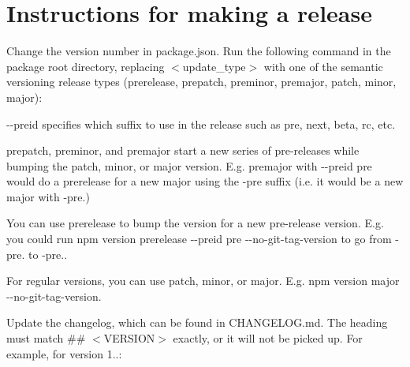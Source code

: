 \chapter{Instructions for making a release}
\hypertarget{md_node__modules_2_0dmapbox_2node-pre-gyp_2_r_e_l_e_a_s_e}{}\label{md_node__modules_2_0dmapbox_2node-pre-gyp_2_r_e_l_e_a_s_e}
\label{md_node__modules_2_0dmapbox_2node-pre-gyp_2_r_e_l_e_a_s_e_autotoc_md4880}%
%



\begin{DoxyEnumerate}
\item Change the version number in {\ttfamily package.\+json}. Run the following command in the package root directory, replacing $<$update\+\_\+type$>$ with one of the semantic versioning release types (prerelease, prepatch, preminor, premajor, patch, minor, major)\+:
\end{DoxyEnumerate}


\begin{DoxyCode}{0}

\end{DoxyCode}


{\ttfamily -\/-\/preid} specifies which suffix to use in the release such as {\ttfamily pre}, {\ttfamily next}, {\ttfamily beta}, {\ttfamily rc}, etc.

{\ttfamily prepatch}, {\ttfamily preminor}, and {\ttfamily premajor} start a new series of pre-\/releases while bumping the patch, minor, or major version. E.\+g. {\ttfamily premajor} with {\ttfamily -\/-\/preid pre} would do a prerelease for a new major using the {\ttfamily -\/pre} suffix (i.\+e. it would be a new major with {\ttfamily -\/pre.})

You can use {\ttfamily prerelease} to bump the version for a new pre-\/release version. E.\+g. you could run {\ttfamily npm version prerelease -\/-\/preid pre -\/-\/no-\/git-\/tag-\/version} to go from {\ttfamily -\/pre.} to {\ttfamily -\/pre.}.

For regular versions, you can use {\ttfamily patch}, {\ttfamily minor}, or {\ttfamily major}. E.\+g. {\ttfamily npm version major -\/-\/no-\/git-\/tag-\/version}.


\begin{DoxyEnumerate}
\item Update the changelog, which can be found in {\ttfamily CHANGELOG.\+md}. The heading must match {\ttfamily \#\# \texorpdfstring{$<$}{<}VERSION\texorpdfstring{$>$}{>}} exactly, or it will not be picked up. For example, for version 1..\+:
\end{DoxyEnumerate}


